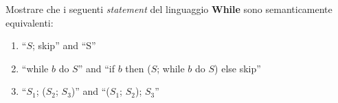 {
  Mostrare che i seguenti \textit{statement} del linguaggio \textbf{While} sono
  semanticamente equivalenti:
  \begin{enumerate}
    \item ``$S$; skip'' and ``S''
    \item ``while $b$ do $S$'' and
      ``if $b$ then ($S$; while $b$ do $S$) else skip''
    \item ``$S_1$; ($S_2$; $S_3$)'' and ``($S_1$; $S_2$); $S_3$''
  \end{enumerate}
}
{

}
